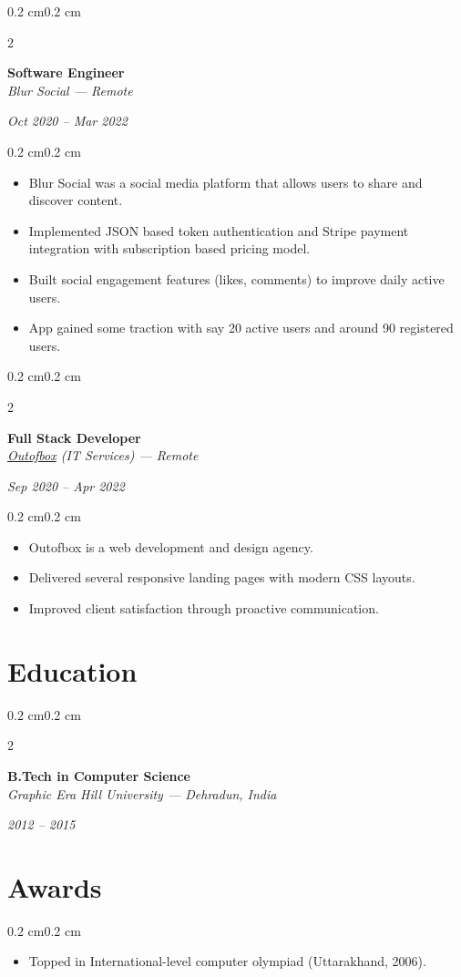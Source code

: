 \documentclass[10pt, letterpaper]{article}
\newenvironment{highlights}{
    \begin{itemize}[
        topsep=0.10 cm,
        parsep=0.10 cm,
        partopsep=0pt,
        itemsep=0pt,
        leftmargin=0.5 cm
    ]
}{
    \end{itemize}
}
\newenvironment{onecolentry}{
    \begin{adjustwidth}{0.2 cm}{0.2 cm}
}{
    \end{adjustwidth}
}
\newenvironment{twocolentry}[2][]{
    \onecolentry
    \def\secondColumn{#2}
    \setcolumnwidth{\fill, 4.5 cm}
    \begin{paracol}{2}
}{
    \switchcolumn \raggedleft \secondColumn
    \end{paracol}
    \endonecolentry
}
\begin{document}
\vspace{0.2cm}

\begin{twocolentry}{\textit{Oct 2020 -- Mar 2022}}
    \textbf{Software Engineer} \\
    \textit{Blur Social — Remote}
\end{twocolentry}
\begin{onecolentry}
\begin{highlights}
    \item Blur Social was a social media platform that allows users to share and discover content.
    \item Implemented JSON based token authentication and Stripe payment integration with subscription based pricing model.
    \item Built social engagement features (likes, comments) to improve daily active users.
    \item App gained some traction with say 20 active users and around 90 registered users. 
\end{highlights}
\end{onecolentry}

\vspace{0.2cm}

\begin{twocolentry}{\textit{Sep 2020 -- Apr 2022}}
    \textbf{Full Stack Developer} \\
    \textit{\href{https://outofbox.co}{Outofbox}  (IT Services) — Remote}
\end{twocolentry}
\begin{onecolentry}
\begin{highlights}
    \item Outofbox is a web development and design agency.
    \item Delivered several responsive landing pages with modern CSS layouts.
    \item Improved client satisfaction through proactive communication.
\end{highlights}
\end{onecolentry}

\section{Education}
\begin{twocolentry}{\textit{2012 -- 2015}}
    \textbf{B.Tech in Computer Science} \\
    \textit{Graphic Era Hill University — Dehradun, India}
\end{twocolentry}

\section{Awards}
\begin{onecolentry}
\begin{highlights}
    \item Topped in International-level computer olympiad (Uttarakhand, 2006).
\end{highlights}
\end{onecolentry}
\end{document}
